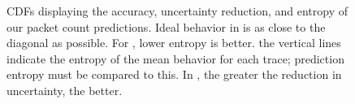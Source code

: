 \documentclass{acm_proc_article-sp}
\begin{document}
\begin{figure}[!t]
\vspace{-1em}
\begin{center}
\caption{%
CDFs displaying the accuracy, uncertainty reduction, and entropy of our packet count predictions.
Ideal behavior in  is as close to the diagonal as possible.
For , lower entropy is better.
the vertical lines indicate the entropy of the mean behavior for each trace;
prediction entropy must be compared to this.
In , the greater the reduction in uncertainty, the better.
}
\end{center}
\vspace{-2em}
\end{figure}
\end{document}

